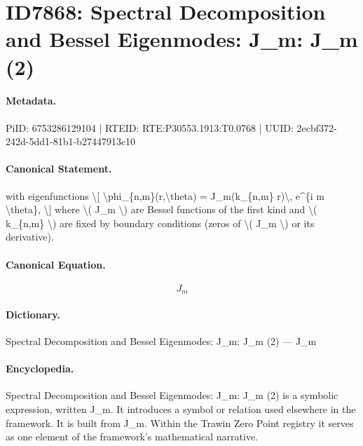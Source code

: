 \section*{ID7868: Spectral Decomposition and Bessel Eigenmodes: J\_m: J\_m (2)}
\paragraph{Metadata.}
PiID: 6753286129104 | RTEID: RTE:P30553.1913:T0.0768 | UUID: 2ecbf372-242d-5dd1-81b1-b27447913c10

\paragraph{Canonical Statement.}
with eigenfunctions \textbackslash{}[ \textbackslash{}phi\_\{n,m\}(r,\textbackslash{}theta) = J\_m(k\_\{n,m\} r)\textbackslash{}, e\textasciicircum{}\{i m \textbackslash{}theta\}, \textbackslash{}] where \textbackslash{}( J\_m \textbackslash{}) are Bessel functions of the first kind and \textbackslash{}( k\_\{n,m\} \textbackslash{}) are fixed by boundary conditions (zeros of \textbackslash{}( J\_m \textbackslash{}) or its derivative).

\paragraph{Canonical Equation.}
\[
J_m
\]

\paragraph{Dictionary.}
Spectral Decomposition and Bessel Eigenmodes: J\_m: J\_m (2) — J\_m

\paragraph{Encyclopedia.}
Spectral Decomposition and Bessel Eigenmodes: J\_m: J\_m (2) is a symbolic expression, written J\_m. It introduces a symbol or relation used elsewhere in the framework. It is built from J\_m. Within the Trawin Zero Point registry it serves as one element of the framework's mathematical narrative.
